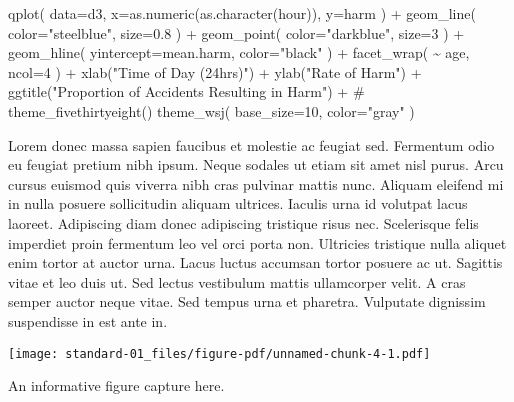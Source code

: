 \documentclass[
  letterpaper,
  DIV=11,
  numbers=noendperiod,
  oneside]{scrreprt}
\newenvironment{Shaded}{\begin{snugshade}}{\end{snugshade}}
\newcommand{\AttributeTok}[1]{\textcolor[rgb]{0.40,0.45,0.13}{#1}}
\newcommand{\CommentTok}[1]{\textcolor[rgb]{0.37,0.37,0.37}{#1}}
\newcommand{\DecValTok}[1]{\textcolor[rgb]{0.68,0.00,0.00}{#1}}
\newcommand{\FloatTok}[1]{\textcolor[rgb]{0.68,0.00,0.00}{#1}}
\newcommand{\FunctionTok}[1]{\textcolor[rgb]{0.28,0.35,0.67}{#1}}
\newcommand{\NormalTok}[1]{\textcolor[rgb]{0.00,0.23,0.31}{#1}}
\newcommand{\SpecialCharTok}[1]{\textcolor[rgb]{0.37,0.37,0.37}{#1}}
\newcommand{\StringTok}[1]{\textcolor[rgb]{0.13,0.47,0.30}{#1}}
\begin{document}
\begin{Shaded}
\begin{Highlighting}[]
\FunctionTok{qplot}\NormalTok{( }\AttributeTok{data=}\NormalTok{d3, }\AttributeTok{x=}\FunctionTok{as.numeric}\NormalTok{(}\FunctionTok{as.character}\NormalTok{(hour)), }\AttributeTok{y=}\NormalTok{harm ) }\SpecialCharTok{+} 
  \FunctionTok{geom\_line}\NormalTok{( }\AttributeTok{color=}\StringTok{"steelblue"}\NormalTok{, }\AttributeTok{size=}\FloatTok{0.8}\NormalTok{ ) }\SpecialCharTok{+} 
  \FunctionTok{geom\_point}\NormalTok{( }\AttributeTok{color=}\StringTok{"darkblue"}\NormalTok{, }\AttributeTok{size=}\DecValTok{3}\NormalTok{ ) }\SpecialCharTok{+} 
  \FunctionTok{geom\_hline}\NormalTok{( }\AttributeTok{yintercept=}\NormalTok{mean.harm, }\AttributeTok{color=}\StringTok{"black"}\NormalTok{ ) }\SpecialCharTok{+} 
  \FunctionTok{facet\_wrap}\NormalTok{( }\SpecialCharTok{\textasciitilde{}}\NormalTok{ age, }\AttributeTok{ncol=}\DecValTok{4}\NormalTok{ ) }\SpecialCharTok{+} 
  \FunctionTok{xlab}\NormalTok{(}\StringTok{"Time of Day (24hrs)"}\NormalTok{) }\SpecialCharTok{+} \FunctionTok{ylab}\NormalTok{(}\StringTok{"Rate of Harm"}\NormalTok{) }\SpecialCharTok{+}
  \FunctionTok{ggtitle}\NormalTok{(}\StringTok{"Proportion of Accidents Resulting in Harm"}\NormalTok{) }\SpecialCharTok{+}
  \CommentTok{\# theme\_fivethirtyeight() }
  \FunctionTok{theme\_wsj}\NormalTok{( }\AttributeTok{base\_size=}\DecValTok{10}\NormalTok{, }\AttributeTok{color=}\StringTok{"gray"}\NormalTok{ )}
\end{Highlighting}
\end{Shaded}

Lorem donec massa sapien faucibus et molestie ac feugiat sed. Fermentum
odio eu feugiat pretium nibh ipsum. Neque sodales ut etiam sit amet nisl
purus. Arcu cursus euismod quis viverra nibh cras pulvinar mattis nunc.
Aliquam eleifend mi in nulla posuere sollicitudin aliquam ultrices.
Iaculis urna id volutpat lacus laoreet. Adipiscing diam donec adipiscing
tristique risus nec. Scelerisque felis imperdiet proin fermentum leo vel
orci porta non. Ultricies tristique nulla aliquet enim tortor at auctor
urna. Lacus luctus accumsan tortor posuere ac ut. Sagittis vitae et leo
duis ut. Sed lectus vestibulum mattis ullamcorper velit. A cras semper
auctor neque vitae. Sed tempus urna et pharetra. Vulputate dignissim
suspendisse in est ante in.

\begin{marginfigure}

{\centering \texttt{[image: standard-01\_files/figure-pdf/unnamed-chunk-4-1.pdf]}

}

\caption{An informative figure capture here.}

\end{marginfigure}
\end{document}
